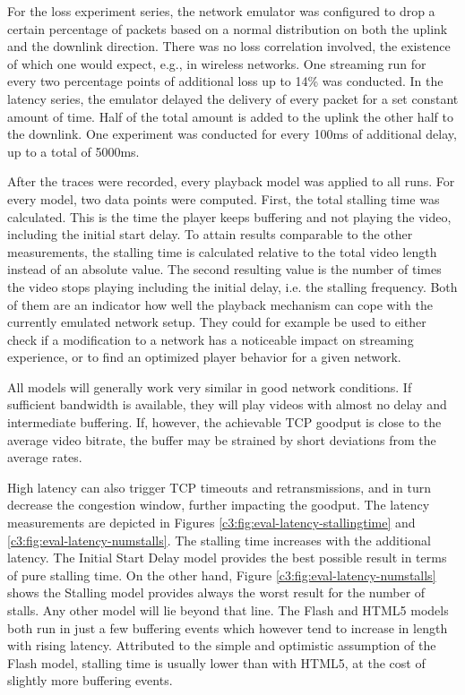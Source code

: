 For the loss experiment series, the network emulator was configured to drop a certain percentage of packets based on a normal distribution on both the uplink and the downlink direction. There was no loss correlation involved, the existence of which one would expect, e.g., in wireless networks. One streaming run for every two percentage points of additional loss up to 14\% was conducted.
In the latency series, the emulator delayed the delivery of every packet for a set constant amount of time. Half of the total amount is added to the uplink the other half to the downlink. One experiment was conducted for every 100ms of additional delay, up to a total of 5000ms.

After the traces were recorded, every playback model was applied to all runs. For every model, two data points were computed. First, the total stalling time was calculated. This is the time the player keeps buffering and not playing the video, including the initial start delay. To attain results comparable to the other measurements, the stalling time is calculated relative to the total video length instead of an absolute value. The second resulting value is the number of times the video stops playing including the initial delay, i.e. the stalling frequency. Both of them are an indicator how well the playback mechanism can cope with the currently emulated network setup. They could for example be used to either check if a modification to a network has a noticeable impact on streaming experience, or to find an optimized player behavior for a given network.

All models will generally work very similar in good network conditions. If sufficient bandwidth is available, they will play videos with almost no delay and  intermediate buffering. If, however, the achievable TCP goodput is close to the average video bitrate, the buffer may be strained by short deviations from the average rates. %

High latency can also trigger TCP timeouts and retransmissions, and in turn decrease the congestion window, further impacting the goodput. The latency measurements are depicted in Figures \ref{c3:fig:eval-latency-stallingtime} and \ref{c3:fig:eval-latency-numstalls}. The stalling time increases with the additional latency. The Initial Start Delay model provides the best possible result in terms of pure stalling time. On the other hand, Figure \ref{c3:fig:eval-latency-numstalls} shows the Stalling model provides always the worst result for the number of stalls. Any other model will lie beyond that line. The Flash and HTML5 models both run in just a few buffering events which however tend to increase in length with rising latency. Attributed to the simple and optimistic assumption of the Flash model, stalling time is usually lower than with HTML5, at the cost of slightly more buffering events.
 


